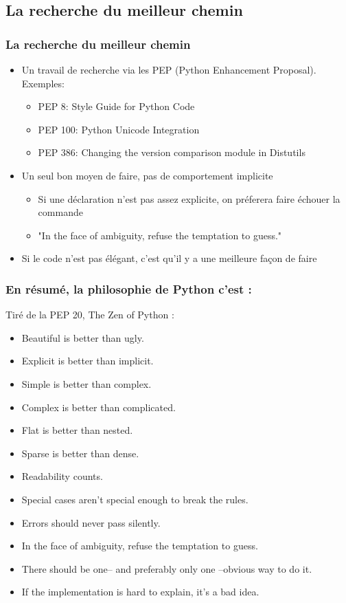 \subsection{La recherche du meilleur chemin}
\begin{frame}
\frametitle{La recherche du meilleur chemin}
  \begin{itemize}
    \item Un travail de recherche via les PEP (Python Enhancement Proposal). Exemples:
    \begin{itemize}
      \item PEP 8: Style Guide for Python Code
      \item PEP 100: Python Unicode Integration
      \item PEP 386: Changing the version comparison module in Distutils
    \end{itemize}
    \pause
    \item Un seul bon moyen de faire, pas de comportement implicite
    \begin{itemize}
      \item Si une déclaration n'est pas assez explicite, on préferera faire échouer la commande
      \item "In the face of ambiguity, refuse the temptation to guess."
    \end{itemize}
    \pause
    \item Si le code n'est pas élégant, c'est qu'il y a une meilleure façon de faire
  \end{itemize}
\end{frame}

\begin{frame}[fragile]
\frametitle{En résumé, la philosophie de Python c'est :}
Tiré de la PEP 20, The Zen of Python :
  \begin{itemize}
    \item Beautiful is better than ugly.
    \item Explicit is better than implicit.
    \item Simple is better than complex.
    \item Complex is better than complicated.
    \item Flat is better than nested.
    \item Sparse is better than dense.
    \item Readability counts.
    \item Special cases aren't special enough to break the rules.
    \item Errors should never pass silently.
    \item In the face of ambiguity, refuse the temptation to guess.
    \item There should be one-- and preferably only one --obvious way to do it.
    \item If the implementation is hard to explain, it's a bad idea.
  \end{itemize}
\end{frame}

